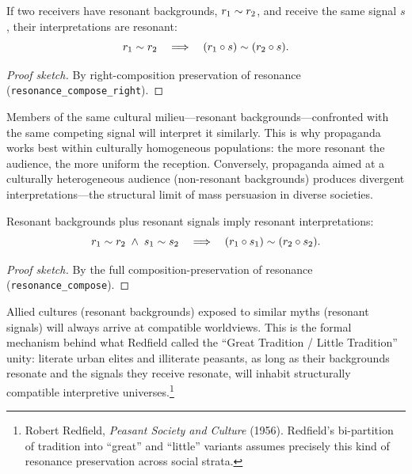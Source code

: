 \begin{theorem}
\label{thm:homogeneous-audience}
If two receivers have resonant backgrounds, $r_1 \sim r_2$, and receive the
same signal $s$, their interpretations are resonant:
\[
  r_1 \sim r_2
  \quad\Longrightarrow\quad
  (r_1 \circ s) \sim (r_2 \circ s).
\]
\end{theorem}

\begin{proof}[Proof sketch]
By right-composition preservation of resonance
(\texttt{resonance\_compose\_right}).
\end{proof}

Members of the same cultural milieu---resonant backgrounds---confronted with
the same competing signal will interpret it similarly.  This is why propaganda
works best within culturally homogeneous populations: the more resonant the
audience, the more uniform the reception.  Conversely, propaganda aimed at a
culturally heterogeneous audience (non-resonant backgrounds) produces
divergent interpretations---the structural limit of mass persuasion in diverse
societies.

\begin{theorem}
\label{thm:full-resonance}
Resonant backgrounds plus resonant signals imply resonant interpretations:
\[
  r_1 \sim r_2 \;\wedge\; s_1 \sim s_2
  \quad\Longrightarrow\quad
  (r_1 \circ s_1) \sim (r_2 \circ s_2).
\]
\end{theorem}

\begin{proof}[Proof sketch]
By the full composition-preservation of resonance
(\texttt{resonance\_compose}).
\end{proof}

Allied cultures (resonant backgrounds) exposed to similar myths (resonant
signals) will always arrive at compatible worldviews.  This is the formal
mechanism behind what Redfield called the ``Great Tradition / Little
Tradition'' unity: literate urban elites and illiterate peasants, as long as
their backgrounds resonate and the signals they receive resonate, will
inhabit structurally compatible interpretive universes.\footnote{Robert
Redfield, \textit{Peasant Society and Culture} (1956).  Redfield's
bi-partition of tradition into ``great'' and ``little'' variants assumes
precisely this kind of resonance preservation across social strata.}

